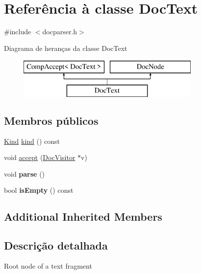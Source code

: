 \hypertarget{class_doc_text}{\section{Referência à classe Doc\-Text}
\label{class_doc_text}
}


{\ttfamily \#include $<$docparser.\-h$>$}

Diagrama de heranças da classe Doc\-Text\begin{figure}[H]
\begin{center}
\leavevmode
\includegraphics[height=2.000000cm]{class_doc_text}
\end{center}
\end{figure}
\subsection*{Membros públicos}
\begin{DoxyCompactItemize}
\item 
\hyperlink{class_doc_node_aa10c9e8951b8ccf714a59ec321bdac5b}{Kind} \hyperlink{class_doc_text_aa9d037bed9f9a083d0cd01485637d843}{kind} () const 
\item 
void \hyperlink{class_doc_text_a7ba716e854ae2f8f87a4eb2140e302b6}{accept} (\hyperlink{class_doc_visitor}{Doc\-Visitor} $\ast$v)
\item 
\hypertarget{class_doc_text_ad7c704b34912678d95c13243cacf9d7f}{void {\bfseries parse} ()}\label{class_doc_text_ad7c704b34912678d95c13243cacf9d7f}

\item 
\hypertarget{class_doc_text_a479432127ee77145cc19d6a2d1590821}{bool {\bfseries is\-Empty} () const }\label{class_doc_text_a479432127ee77145cc19d6a2d1590821}

\end{DoxyCompactItemize}
\subsection*{Additional Inherited Members}


\subsection{Descrição detalhada}
Root node of a text fragment 

